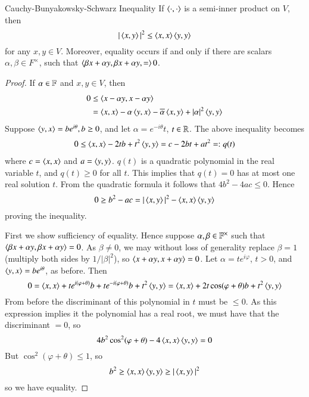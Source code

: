 \begin{nthm}{Cauchy-Bunyakowsky-Schwarz Inequality}\label{nthm:CBS}
    If $\left\langle \cdot, \cdot\right\rangle$ is a semi-inner product on $V$, then $$|\left\langle x, y\right\rangle|^2 \leq \left\langle x, x\right\rangle\left\langle y, y\right\rangle$$
    for any $x,y \in V$. Moreover, equality occurs if and only if there are scalars $\alpha,\beta \in F^{\times}$, such that $\left\langle \beta x+\alpha y,\beta x+\alpha y, =\right\rangle 0$.
\end{nthm}
\begin{proof}
    If $\alpha \in \mathbb F$ and $x,y \in V$, then \begin{align*}
        0 &\leq \left\langle x-\alpha y, x-\alpha y\right\rangle \\
        &= \left\langle x, x\right\rangle - \alpha\left\langle y, x\right\rangle -\overline{\alpha}\left\langle x, y\right\rangle + |\alpha|^2\left\langle y, y\right\rangle
    \end{align*}
    Suppose $\left\langle y, x\right\rangle = be^{i\theta}, b \geq 0$, and let $\alpha = e^{-i\theta}t$, $t \in \mathbb R$. The above inequality becomes \begin{align*}
        0 \leq \left\langle x, x\right\rangle - 2tb+t^2\left\langle y, y\right\rangle = c-2bt+at^2=:q(t)
    \end{align*}
    where $c = \left\langle x, x\right\rangle$ and $a = \left\langle y, y\right\rangle$. $q(t)$ is a quadratic polynomial in the real variable $t$, and $q(t) \geq 0$ for all $t$. This implies that $q(t) = 0$ has at most one real solution $t$. From the quadratic formula it follows that $4b^2-4ac \leq 0$. Hence $$0 \geq b^2-ac = |\left\langle x, y\right\rangle|^2 - \left\langle x, x\right\rangle\left\langle y, y\right\rangle$$
    proving the inequality.

    First we show sufficiency of equality. Hence suppose $\alpha,\beta \in \mathbb F^{\times}$ such that $\left\langle \beta x+\alpha y, \beta x+\alpha y\right\rangle = 0$. As $\beta \neq 0$, we may without loss of generality replace $\beta = 1$ (multiply both sides by $1/|\beta|^2$), so $\left\langle x+\alpha y, x+\alpha y\right\rangle = 0$. Let $\alpha = te^{i\varphi}$, $t > 0$, and $\left\langle y, x\right\rangle = be^{i\theta}$, as before. Then $$0 = \left\langle x, x\right\rangle + te^{i(\varphi+\theta)}b+te^{-i(\varphi+\theta)}b+t^2\left\langle y, y\right\rangle = \left\langle x, x\right\rangle + 2t\cos(\varphi+\theta)b+t^2\left\langle y, y\right\rangle$$
    From before the discriminant of this polynomial in $t$ must be $\leq 0$. As this expression implies it the polynomial has a real root, we must have that the discriminant $= 0$, so $$4b^2\cos^2(\varphi+\theta)-4\left\langle x, x\right\rangle\left\langle y, y\right\rangle = 0$$
    But $\cos^2(\varphi+\theta) \leq 1$, so $$b^2 \geq \left\langle x, x\right\rangle\left\langle y, y\right\rangle \geq |\left\langle x, y\right\rangle|^2$$
    so we have equality.


\end{proof}
